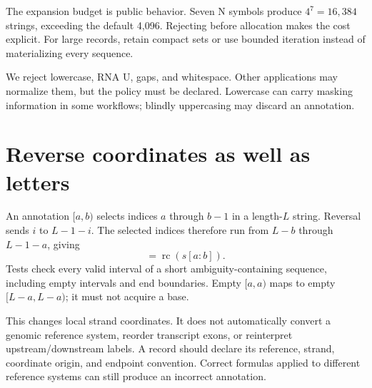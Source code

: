 
The expansion budget is public behavior. Seven N symbols produce
$4^7=16{,}384$ strings, exceeding the default 4,096. Rejecting before
allocation makes the cost explicit. For large records, retain compact sets
or use bounded iteration instead of materializing every sequence.

We reject lowercase, RNA U, gaps, and whitespace. Other applications may
normalize them, but the policy must be declared. Lowercase can carry masking
information in some workflows; blindly uppercasing may discard an annotation.

\section{Reverse coordinates as well as letters}

An annotation $[a,b)$ selects indices $a$ through $b-1$ in a length-$L$
string. Reversal sends $i$ to $L-1-i$. The selected indices therefore run
from $L-b$ through $L-1-a$, giving
\begin{equation}
[a,b)\longmapsto[L-b,L-a).
\label{eq:interval}
\end{equation}
The endpoint $b$ was excluded. Treating both boundaries as included base
indices creates an off-by-one error.

\Plate{05-interval}{A length-nine annotation transformed with its strand. Ticks denote boundaries 0 through 9; bases occupy the spaces between ticks. Original \texttt{GTAG} in $[2,6)$ becomes \texttt{CTAC} in $[3,7)$ of the reverse complement. Both intervals contain four bases.}{fig:interval}

\Listing{reverse_interval}

For \texttt{ACGTAGCTA}, the reverse complement is \texttt{TAGCTACGT}.
The coordinate and string operations must satisfy
\begin{equation}
\operatorname{rc}(s)[L-b:L-a]=\operatorname{rc}(s[a:b]).
\label{eq:slice}
\end{equation}
Tests check every valid interval of a short ambiguity-containing sequence,
including empty intervals and end boundaries. Empty $[a,a)$ maps to empty
$[L-a,L-a)$; it must not acquire a base.

This changes local strand coordinates. It does not automatically convert
a genomic reference system, reorder transcript exons, or reinterpret
upstream/downstream labels. A record should declare its reference, strand,
coordinate origin, and endpoint convention. Correct formulas applied to
different reference systems can still produce an incorrect annotation.

